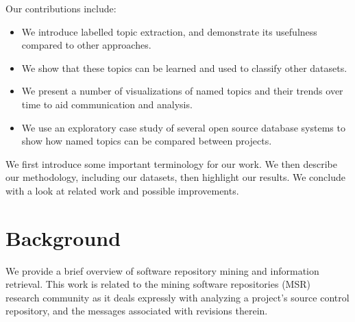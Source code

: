 \documentclass{acm_proc_article-sp}
\begin{document}
\begin{comment}
Typically what is distinct is the software's particular functionality -- whether it offers email composition, prepares tax returns, and so on. What is common, however, is the non-functional, or quality requirements, that the software focuses on. Our approach makes use of software quality taxonomies in order to compare different projects on similar concepts. For example, how is the Security quality treated over time by product A versus product B? Does product A care about it more as it matures? Does the quality occur more often in software commits?
\end{comment}

Our contributions include:
\begin{itemize}
\item  We introduce labelled topic extraction, and demonstrate its usefulness
  compared to other approaches.
\item We show that these topics can be learned and used to classify other datasets.
\item We present a number of visualizations of named topics and their trends over time to aid
  communication and analysis.
\item We use an exploratory case study of
  several open source database systems to show how named topics can be compared between projects.
\end{itemize}

We first introduce some important terminology for our work. We then describe our methodology, including our datasets, then highlight our results. We conclude with a look at related work and possible improvements.

\section{Background}

We provide a brief overview of software repository mining and information retrieval.
This work is related to the mining software repositories (MSR)~\cite{msr} research community as it deals expressly with analyzing a project's source control repository, and the messages associated with revisions therein.
\end{document}
